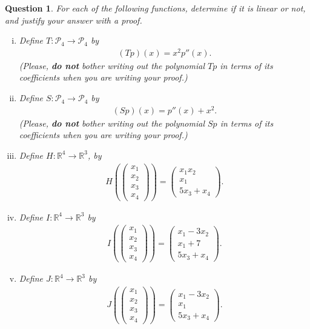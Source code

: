 \documentclass[12pt]{article}
\newtheorem{question}[thm]{Question}
\def\real{{\mathbb R}}
\def\P{\mathcal P}
\newcommand{\ColVecThree}[3]{\begin{pmatrix} #1\\ #2\\ #3\end{pmatrix}}
\newcommand{\ColVecFour}[4]{\begin{pmatrix} #1\\ #2\\#3 \\ #4\end{pmatrix}}
\begin{document}
\begin{question}
	\normalfont
	
	For each of the following functions, determine if it is linear or not, and justify your answer with a proof.
	
	
	\begin{enumerate}[(i)]
		\item Define $T:\P_4\to \P_4$ by 
		\begin{align*}
			(Tp)(x) =  x^2p''(x).
		\end{align*}
		(Please, \textbf{do not} bother writing out the polynomial $Tp$ in terms of its coefficients when you are writing your proof.) \\
		
		\item Define $S:\P_4\to \P_4$ by 
		\begin{align*}
			(Sp)(x) =  p''(x) + x^2.
		\end{align*}
		(Please, \textbf{do not} bother writing out the polynomial $Sp$ in terms of its coefficients when you are writing your proof.) \\
		
		\item Define $H:\real^4\to \real^3$,  by 
		\begin{align*}
			 H(\ColVecFour{x_1}{x_2}{x_3}{x_4})=  \ColVecThree{x_1x_2}{x_1}{5x_3 + x_4}.
		\end{align*}
		\vspace{.3cm}
		
		\item Define $I:\real^4\to \real^3$ by 
		\begin{align*}
			 I(\ColVecFour{x_1}{x_2}{x_3}{x_4})=  \ColVecThree{x_1-3x_2}{x_1+7}{5x_3 + x_4}.
		\end{align*}
			\vspace{.3cm}
			
		\item Define  $J:\real^4\to \real^3$ by 
		\begin{align*}
			 J(\ColVecFour{x_1}{x_2}{x_3}{x_4})=  \ColVecThree{x_1-3x_2}{x_1}{5x_3 + x_4}.
		\end{align*}
		
		
	\end{enumerate}
	
	
\end{question}

\vspace{.5cm}
\end{document}
